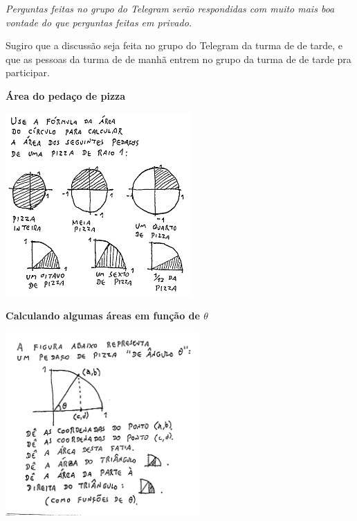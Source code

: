 \documentclass[oneside,12pt]{article}
\begin{document}
\ssk

{\sl Perguntas feitas no grupo do Telegram serão respondidas com muito
  mais boa vontade do que perguntas feitas em privado.}

\msk

Sugiro que a discussão seja feita no grupo do Telegram da turma de de
tarde, e que as pessoas da turma de de manhã entrem no grupo da turma
de de tarde pra participar.

% 
% 
% 
% 
% 




\newpage

{\bf Área do pedaço de pizza}

\includegraphics[height=7cm]{2020-1-C2/20201213_area_fatias_pizza.pdf}

\newpage

{\bf Calculando algumas áreas em função de $θ$}

\includegraphics[height=7cm]{2020-1-C2/20201213_area_em_funcao_de_theta.pdf}
\end{document}
